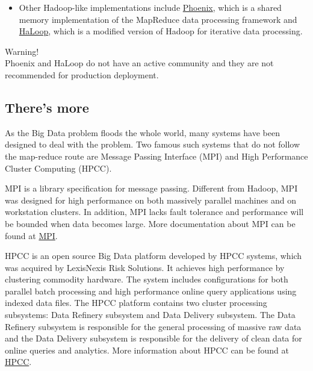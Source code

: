 \begin{itemize}
  \item Other Hadoop-like implementations include \href{http://mapreduce.stanford.edu/}{Phoenix}, which is a shared memory implementation of the MapReduce data processing framework and \href{http://code.google.com/p/haloop/}{HaLoop}, which is a modified version of Hadoop for iterative data processing.
\end{itemize}

\begin{warning}
Warning! \\
Phoenix and HaLoop do not have an active community and they are not recommended for production deployment.
\end{warning} 

\subsection*{There's more}
As the Big Data problem floods the whole world, many systems have been designed to deal with the problem. Two famous such systems that do not follow the map-reduce route are Message Passing Interface (MPI) and High Performance Cluster Computing (HPCC).
\begin{description}
  \item{MPI} is a library specification for message passing. Different from Hadoop, MPI was designed for high performance on both massively parallel machines and on workstation clusters. In addition, MPI lacks fault tolerance and performance will be bounded when data becomes large. More documentation about MPI can be found at \href{http://www.mpi-forum.org/}{MPI}.
  \item{HPCC} is an open source Big Data platform developed by HPCC systems, which was acquired by LexisNexis Risk Solutions. It achieves high performance by clustering commodity hardware. The system includes configurations for both parallel batch processing and high performance online query applications using indexed data files. The HPCC platform contains two cluster processing subsystems: Data Refinery subsystem and Data Delivery subsystem. The Data Refinery subsystem is responsible for the general processing of massive raw data and the Data Delivery subsystem is responsible for the delivery of clean data for online queries and analytics. More information about HPCC can be found at \href{http://hpccsystems.com/}{HPCC}.
\end{description}
